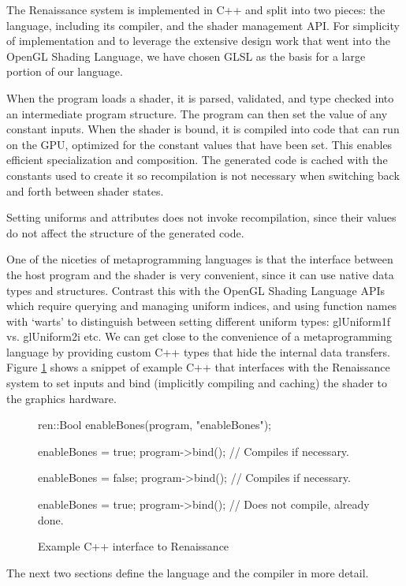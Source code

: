 \documentclass{acmsiggraph}               %
\begin{document}
The Renaissance system is implemented in C++ and split into two
pieces: the language, including its compiler, and the shader
management API.  For simplicity of implementation and to leverage the
extensive design work that went into the OpenGL Shading Language, we
have chosen GLSL as the basis for a large portion of our language.

When the program loads a shader, it is parsed, validated, and type
checked into an intermediate program structure.  The program can then
set the value of any constant inputs.  When the shader is bound, it is
compiled into code that can run on the GPU, optimized for the constant
values that have been set.  This enables efficient specialization and
composition.  The generated code is cached with the constants used to
create it so recompilation is not necessary when switching back and
forth between shader states.

Setting uniforms and attributes does not invoke recompilation, since
their values do not affect the structure of the generated code.

One of the niceties of metaprogramming languages is that the interface
between the host program and the shader is very convenient, since it
can use native data types and structures.  Contrast this with the
OpenGL Shading Language APIs which require querying and managing
uniform indices, and using function names with `warts' to distinguish
between setting different uniform types: glUniform1f vs. glUniform2i
etc.  We can get close to the convenience of a metaprogramming
language by providing custom C++ types that hide the internal data
transfers.  Figure \ref{InterfaceCode} shows a snippet of example C++
that interfaces with the Renaissance system to set inputs and bind
(implicitly compiling and caching) the shader to the graphics
hardware.

\begin{figure}
\begin{MyVerb}
ren::Bool enableBones(program, "enableBones");

enableBones = true;
program->bind();  // Compiles if necessary.

enableBones = false;
program->bind();  // Compiles if necessary.

enableBones = true;
program->bind();  // Does not compile, already done.
\end{MyVerb}
\caption{Example C++ interface to Renaissance}
\label{InterfaceCode}
\end{figure}

The next two sections define the language and the compiler in more detail.
\end{document}
